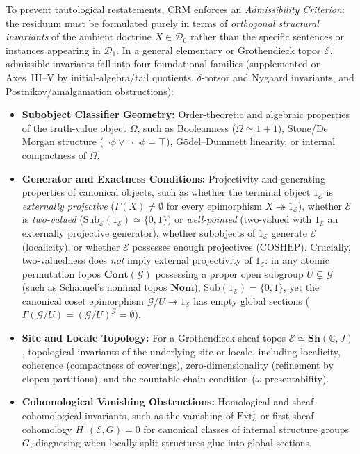 \documentclass[10pt,twoside,openright]{book}
\theoremstyle{crmplain}
\theoremstyle{crmdef}
\theoremstyle{crmremark}
\begin{document}
To prevent tautological restatements, $\mathrm{CRM}$ enforces an \emph{Admissibility Criterion}: the residuum must be formulated purely in terms of \emph{orthogonal structural invariants} of the ambient doctrine $X \in \mathcal{D}_0$ rather than the specific sentences or instances appearing in $\mathcal{D}_1$. In a general elementary or Grothendieck topos $\mathcal{E}$, admissible invariants fall into four foundational families (supplemented on Axes~III--V by initial-algebra/tail quotients, $\delta$-torsor and Nygaard invariants, and Postnikov/amalgamation obstructions):

\begin{itemize}[leftmargin=1.5em]

  \item \textbf{Subobject Classifier Geometry:} Order-theoretic and algebraic properties of the truth-value object $\Omega$, such as Booleanness ($\Omega \simeq 1+1$), Stone/De Morgan structure ($\neg\phi \vee \neg\neg\phi = \top$), G\"odel--Dummett linearity, or internal compactness of $\Omega$.

  \item \textbf{Generator and Exactness Conditions:} Projectivity and generating properties of canonical objects, such as whether the terminal object $1_{\mathcal{E}}$ is \emph{externally projective} ($\Gamma(X) \neq \emptyset$ for every epimorphism $X \twoheadrightarrow 1_{\mathcal{E}}$), whether $\mathcal{E}$ is \emph{two-valued} ($\mathrm{Sub}_{\mathcal{E}}(1_{\mathcal{E}}) \simeq \{0, 1\}$) or \emph{well-pointed} (two-valued with $1_{\mathcal{E}}$ an externally projective generator), whether subobjects of $1_{\mathcal{E}}$ generate $\mathcal{E}$ (localicity), or whether $\mathcal{E}$ possesses enough projectives ($\mathrm{COSHEP}$). Crucially, two-valuedness does \emph{not} imply external projectivity of $1_{\mathcal{E}}$: in any atomic permutation topos $\mathbf{Cont}(\mathcal{G})$ possessing a proper open subgroup $U \subsetneq \mathcal{G}$ (such as Schanuel's nominal topos $\mathbf{Nom}$), $\mathrm{Sub}(1_{\mathcal{E}}) = \{0, 1\}$, yet the canonical coset epimorphism $\mathcal{G}/U \twoheadrightarrow 1_{\mathcal{E}}$ has empty global sections ($\Gamma(\mathcal{G}/U) = (\mathcal{G}/U)^{\mathcal{G}} = \emptyset$).

  \item \textbf{Site and Locale Topology:} For a Grothendieck sheaf topos $\mathcal{E} \simeq \mathbf{Sh}(\mathbb{C}, J)$, topological invariants of the underlying site or locale, including localicity, coherence (compactness of coverings), zero-dimensionality (refinement by clopen partitions), and the countable chain condition ($\omega$-presentability).

  \item \textbf{Cohomological Vanishing Obstructions:} Homological and sheaf-cohomological invariants, such as the vanishing of $\mathrm{Ext}^1_{\mathcal{E}}$ or first sheaf cohomology $H^1(\mathcal{E}, G) = 0$ for canonical classes of internal structure groups $G$, diagnosing when locally split structures glue into global sections.

\end{itemize}
\end{document}

